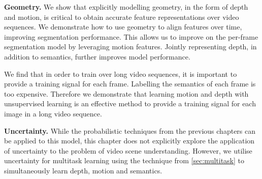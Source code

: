 \textbf{Geometry.}
We show that explicitly modelling geometry, in the form of depth and motion, is critical to obtain accurate feature representations over video sequences. We demonstrate how to use geometry to align features over time, improving segmentation performance. This allows us to improve on the per-frame segmentation model by leveraging motion features. Jointly representing depth, in addition to semantics, further improves model performance.

We find that in order to train over long video sequences, it is important to provide a training signal for each frame. Labelling the semantics of each frame is too expensive. Therefore we demonstrate that learning motion and depth with unsupervised learning is an effective method to provide a training signal for each image in a long video sequence.

\textbf{Uncertainty.}
While the probabilistic techniques from the previous chapters can be applied to this model, this chapter does not explicitly explore the application of uncertainty to the problem of video scene understanding. However, we utilise uncertainty for multitask learning using the technique from \cref{sec:multitask} to simultaneously learn depth, motion and semantics.

